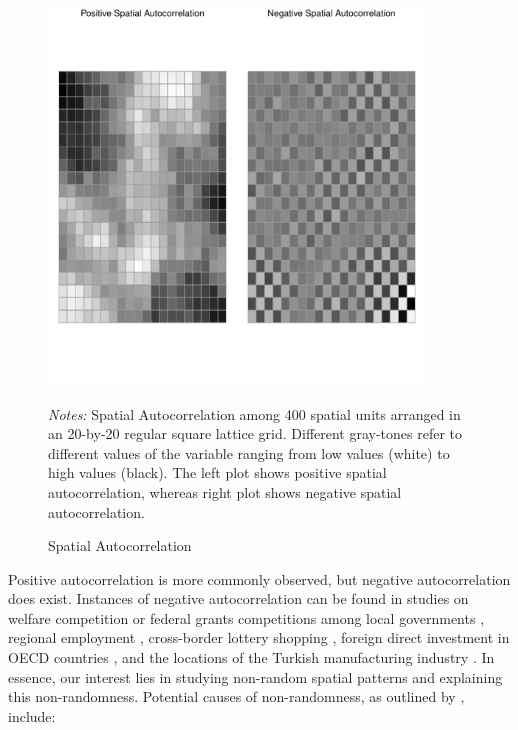 \begin{figure}[ht]
  \caption{Spatial Autocorrelation}
    \label{fig:Autocorrelation}
    \centering
    	\begin{minipage}{1\linewidth}
\begin{knitrout}
\color{fgcolor}

{\centering \includegraphics[width=10cm,height=10cm]{figure/Autocorrelation-1} 

}


\end{knitrout}
\footnotesize
		\emph{Notes:} Spatial Autocorrelation among 400 spatial units arranged in an 20-by-20 regular square lattice grid. Different gray-tones refer to different values of the variable ranging from low values (white) to high values (black). The left plot shows positive spatial autocorrelation, whereas right plot shows negative spatial autocorrelation. 
	\end{minipage}	
\end{figure}

Positive autocorrelation is more commonly observed, but negative autocorrelation does exist. Instances of negative autocorrelation can be found in studies on welfare competition or federal grants competitions among local governments \citep{saavedra2000model, boarnet2002federal}, regional employment \citep{filiztekin2009regional, pavlyuk2011spatial}, cross-border lottery shopping \citep{garrett2002revenue}, foreign direct investment in OECD countries \citep{garretsen2009fdi}, and the locations of the Turkish manufacturing industry \citep{basdas2009spatial}. In essence, our interest lies in studying non-random spatial patterns and explaining this non-randomness. Potential causes of non-randomness, as outlined by \cite{gibbons2015spatial}, include:

